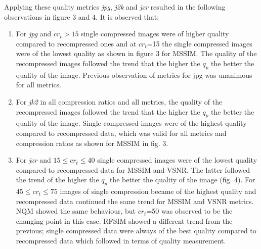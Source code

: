 \documentclass[10pt,twocolumn,letterpaper]{article}
\begin{document}
Applying these quality metrics \emph{jpg}, \emph{j2k} and \emph{jxr} resulted in the following observations in figure 3 and 4. It is observed that:
\begin{enumerate}
	\item For \emph{jpg} and $cr_t>15 $ single compressed images were of higher quality compared to recompressed ones and
		 at $cr_t$=15 the single compressed images were of the lowest quality as shown in figure 3 for MSSIM.
		 The quality of the recompressed images followed the trend that the higher the $q_p$ the better the quality of the image. Previous observation of metrics for jpg was unanimous for all metrics.
	
	\item For \emph{jk2} in all compression ratios and all metrics, the quality of the recompressed images followed the trend that the higher the $q_p$ the better the quality of the image. Single compressed images were of the highest quality compared to recompressed data, which was valid for all metrics and compression ratios as shown for MSSIM in fig. 3.
			  
	
		\item For \emph{jxr} and $15\leq{cr_t}\leq{40}$ single compressed images were of the lowest quality compared to recompressed data for MSSIM and VSNR. The latter followed the trend of the higher the $q_p$ the better the quality of the image (fig. 4).	 
        For $45\leq{cr_t}\leq{75}$ images of single compression became of the highest quality and  recompressed data continued the same trend for MSSIM and VSNR metrics.
        NQM showed the same behaviour, but ${cr_t}$=50 was observed to be the changing point in this case. RFSIM showed a different trend from the previous; single compressed data were always of the best quality compared to recompressed data which followed in terms of quality measurement. 
   
   
   
\end{enumerate}
\end{document}
